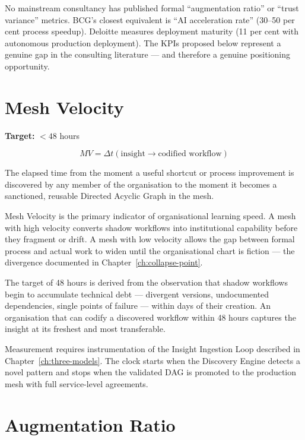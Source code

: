 \begin{keyinsight}
No mainstream consultancy has published formal ``augmentation ratio'' or ``trust variance'' metrics. BCG's closest equivalent is ``AI acceleration rate'' (30--50 per cent process speedup). Deloitte measures deployment maturity (11 per cent with autonomous production deployment). The KPIs proposed below represent a genuine gap in the consulting literature --- and therefore a genuine positioning opportunity.
\end{keyinsight}

\section{Mesh Velocity}

\begin{definitionbox}[title={Mesh Velocity (MV)}]
\textbf{Target:} $< 48$ hours

\[
MV = \Delta t \left( \text{insight} \rightarrow \text{codified workflow} \right)
\]

The elapsed time from the moment a useful shortcut or process improvement is discovered by any member of the organisation to the moment it becomes a sanctioned, reusable Directed Acyclic Graph in the mesh.
\end{definitionbox}

Mesh Velocity is the primary indicator of organisational learning speed. A mesh with high velocity converts shadow workflows into institutional capability before they fragment or drift. A mesh with low velocity allows the gap between formal process and actual work to widen until the organisational chart is fiction --- the divergence documented in Chapter~\ref{ch:collapse-point}.

The target of 48 hours is derived from the observation that shadow workflows begin to accumulate technical debt --- divergent versions, undocumented dependencies, single points of failure --- within days of their creation. An organisation that can codify a discovered workflow within 48 hours captures the insight at its freshest and most transferable.

Measurement requires instrumentation of the Insight Ingestion Loop described in Chapter~\ref{ch:three-models}. The clock starts when the Discovery Engine detects a novel pattern and stops when the validated DAG is promoted to the production mesh with full service-level agreements.

\section{Augmentation Ratio}

